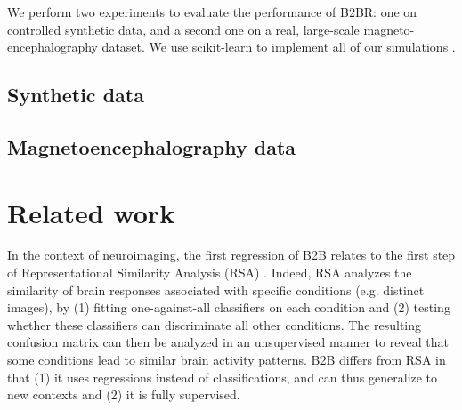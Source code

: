 \documentclass{article}
\begin{document}
We perform two experiments to evaluate the performance of B2BR: one on controlled synthetic data, and a second one on a real, large-scale magneto-encephalography dataset.
%
We use scikit-learn to implement all of our simulations \citep{sklearn}.

\subsection{Synthetic data}
\label{sec:experiment_synthetic}



\subsection{Magnetoencephalography data}
\label{sec:experiment_real}



\section{Related work}

In the context of neuroimaging, the first regression of B2B relates to the first step of Representational Similarity Analysis (RSA) \citep{kriegeskorte2008representational}. Indeed, RSA analyzes the similarity of brain responses associated with specific conditions (e.g. distinct images), by (1) fitting one-against-all classifiers on each condition and (2) testing whether these classifiers can discriminate all other conditions. The resulting confusion matrix can then be analyzed in an unsupervised manner to reveal that some conditions lead to similar brain activity patterns. B2B differs from RSA in that (1) it uses regressions instead of classifications, and can thus generalize to new contexts and (2)
it is fully supervised.
\end{document}
